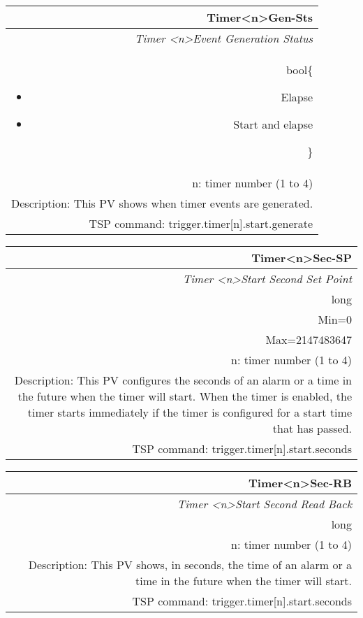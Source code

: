 \documentclass[openany]{article}
\begin{document}
		\begin{tabular}{N}
			\hline
			\bfseries Timer{\textless n\textgreater}Gen-Sts\label{pv:timergen-sts} \\ \hline
			\emph{Timer \textless n\textgreater Event Generation Status} \\
			bool\{\begin{itemize}[noitemsep]
				\small
				\item[] Elapse
				\item[] Start and elapse
			\end{itemize}\} \\
			n: timer number (1 to 4) \\
			Description: This PV shows when timer events are generated. \\
			TSP command: trigger.timer[n].start.generate
		\end{tabular}

		\begin{tabular}{N}
			\hline
			\bfseries Timer{\textless n\textgreater}Sec-SP\label{pv:timersec-sp} \\ \hline
			\emph{Timer \textless n\textgreater Start Second Set Point} \\
			long \\
			Min=0 \\ 
			Max=2147483647 \\
			n: timer number (1 to 4) \\
			Description: This PV configures the seconds of an alarm or a time in the future when the timer will start. When the timer is enabled, the timer starts immediately if the timer is configured for a start time that has passed. \\
			TSP command: trigger.timer[n].start.seconds
		\end{tabular}

		\begin{tabular}{N}
			\hline
			\bfseries Timer{\textless n\textgreater}Sec-RB\label{pv:timersec-rb} \\ \hline
			\emph{Timer \textless n\textgreater Start Second Read Back} \\
			long \\
			n: timer number (1 to 4) \\
			Description: This PV shows, in seconds, the time of an alarm or a time in the future when the timer will start. \\
			TSP command: trigger.timer[n].start.seconds
		\end{tabular}
\end{document}
